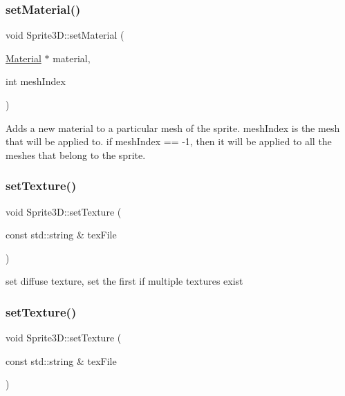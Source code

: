 \subsubsection{\texorpdfstring{set\+Material()}{setMaterial()}\hspace{0.1cm}{\footnotesize\ttfamily [4/4]}}
{\footnotesize\ttfamily void Sprite3\+D\+::set\+Material (\begin{DoxyParamCaption}\item[{\hyperlink{classMaterial}{Material} $\ast$}]{material,  }\item[{int}]{mesh\+Index }\end{DoxyParamCaption})}

Adds a new material to a particular mesh of the sprite. mesh\+Index is the mesh that will be applied to. if mesh\+Index == -\/1, then it will be applied to all the meshes that belong to the sprite. \mbox{\label{classSprite3D_af6dc6865a71a7e768a089e5d2704b7dc}} 
\subsubsection{\texorpdfstring{set\+Texture()}{setTexture()}\hspace{0.1cm}{\footnotesize\ttfamily [1/2]}}
{\footnotesize\ttfamily void Sprite3\+D\+::set\+Texture (\begin{DoxyParamCaption}\item[{const std\+::string \&}]{tex\+File }\end{DoxyParamCaption})}

set diffuse texture, set the first if multiple textures exist \mbox{\label{classSprite3D_af6dc6865a71a7e768a089e5d2704b7dc}} 
\subsubsection{\texorpdfstring{set\+Texture()}{setTexture()}\hspace{0.1cm}{\footnotesize\ttfamily [2/2]}}
{\footnotesize\ttfamily void Sprite3\+D\+::set\+Texture (\begin{DoxyParamCaption}\item[{const std\+::string \&}]{tex\+File }\end{DoxyParamCaption})}

